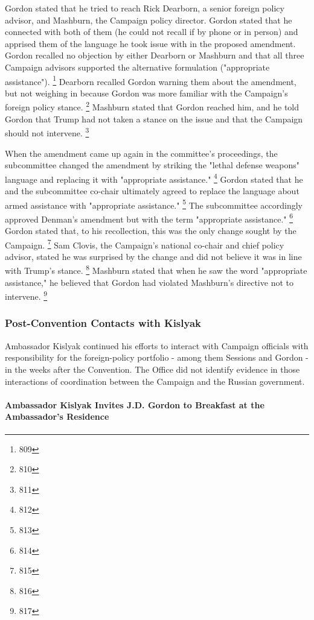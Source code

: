 Gordon stated that he tried to reach Rick Dearborn, a senior foreign policy advisor, and Mashburn, the Campaign policy director.
Gordon stated that he connected with both of them (he could not recall if by phone or in person) and apprised them of the language he took issue with in the proposed amendment.
Gordon recalled no objection by either Dearborn or Mashburn and that all three Campaign advisors supported the alternative formulation ("appropriate assistance").%
\footnote{809}
Dearborn recalled Gordon warning them about the amendment, but not weighing in because Gordon was more familiar with the Campaign's foreign policy stance.%
\footnote{810}
Mashburn stated that Gordon reached him, and he told Gordon that Trump had not taken a stance on the issue and that the Campaign should not intervene.%
\footnote{811}

When the amendment came up again in the committee's proceedings, the subcommittee changed the amendment by striking the "lethal defense weapons" language and replacing it with "appropriate assistance."%
\footnote{812}
Gordon stated that he and the subcommittee co-chair ultimately agreed to replace the language about armed assistance with "appropriate assistance."%
\footnote{813}
The subcommittee accordingly approved Denman's amendment but with the term "appropriate assistance."%
\footnote{814}
Gordon stated that, to his recollection, this was the only change sought by the Campaign.%
\footnote{815}
Sam Clovis, the Campaign's national co-chair and chief policy advisor, stated he was surprised by the change and did not believe it was in line with Trump's stance.%
\footnote{816}
Mashburn stated that when he saw the word "appropriate assistance," he believed that Gordon had violated Mashburn's directive not to intervene.%
\footnote{817}

\subsubsection{Post-Convention Contacts with Kislyak}

Ambassador Kislyak continued his efforts to interact with Campaign officials with responsibility for the foreign-policy portfolio - among them Sessions and Gordon - in the weeks after the Convention.
The Office did not identify evidence in those interactions of coordination between the Campaign and the Russian government.

\paragraph{Ambassador Kislyak Invites J.D. Gordon to Breakfast at the Ambassador's Residence}

